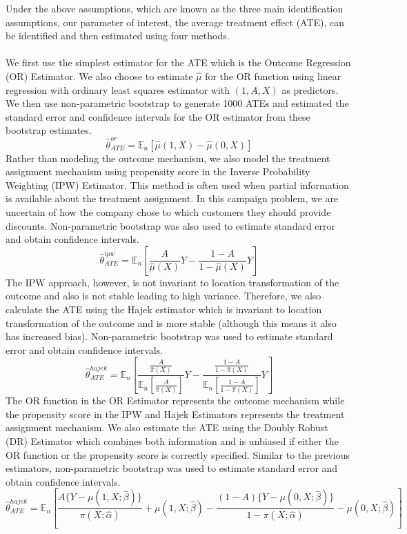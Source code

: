 \documentclass[10pt]{article}
\newcommand{\E}{\mathbb{E}}
\begin{document}
Under the above assumptions, which are known as the three main identification assumptions, our parameter of interest, the average treatment effect (ATE), can be identified and then estimated using four methods.\\
\\
We first use the simplest estimator for the ATE which is the Outcome Regression (OR) Estimator. We also choose to estimate $\hat{\mu}$ for the OR function using linear regression with ordinary least squares estimator with $(1, A, X)$ as predictors. We then use non-parametric bootstrap to generate 1000 ATEs and estimated the standard error and confidence intervals for the OR estimator from these bootstrap estimates.
\[
\hat{\theta}_{ATE}^{or} = \E_n[\hat{\mu}(1,X) - \hat{\mu}(0,X)]
\]
Rather than modeling the outcome mechanism, we also model the treatment assignment mechanism using propensity score in the Inverse Probability Weighting (IPW) Estimator. This method is often used when partial information is available about the treatment assignment. In this campaign problem, we are uncertain of how the company chose to which customers they should provide discounts. Non-parametric bootstrap was also used to estimate standard error and obtain confidence intervals.
\[
\hat{\theta}_{ATE}^{ipw} = \E_n[\frac{A}{\hat{\mu}(X)}Y - \frac{1-A}{1-\hat{\mu}(X)}Y]
\]
The IPW approach, however, is not invariant to location transformation of the outcome and also is not stable leading to high variance. Therefore, we also calculate the ATE using the Hajek estimator which is invariant to location transformation of the outcome and is more stable (although this means it also has increased bias). Non-parametric bootstrap was used to estimate standard error and obtain confidence intervals.
\[
\hat{\theta}_{ATE}^{hajek} = \E_n\left[\frac{\frac{A}{\hat{\pi}(X)}}{\E_n[\frac{A}{\hat{\pi}(X)}]}Y - \frac{\frac{1-A}{1-\hat{\pi}(X)}}{\E_n[\frac{1-A}{1-\hat{\pi}(X)}]}Y\right]
\]
The OR function in the OR Estimator represents the outcome mechanism while the propensity score in the IPW and Hajek Estimators represents the treatment assignment mechanism. We also estimate the ATE using the Doubly Robust (DR) Estimator which combines both information and is unbiased if either the OR function or the propensity score is correctly specified. Similar to the previous estimators, non-parametric bootstrap was used to estimate standard error and obtain confidence intervals.
\[
\hat{\theta}_{ATE}^{hajek} = \E_n\left[\frac{A\{Y-\mu(1,X;\hat{\beta})\}}{\pi(X;\hat{\alpha})} + \mu(1,X;\hat{\beta}) - \frac{(1-A)\{Y-\mu(0,X;\hat{\beta})\}}{1-\pi(X;\hat{\alpha})} - \mu(0,X;\hat{\beta})\right]
\]
\end{document}
